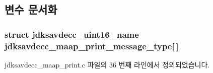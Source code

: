 \subsection{변수 문서화}
\subsubsection[{\texorpdfstring{jdksavdecc\+\_\+maap\+\_\+print\+\_\+message\+\_\+type}{jdksavdecc_maap_print_message_type}}]{\setlength{\rightskip}{0pt plus 5cm}struct {\bf jdksavdecc\+\_\+uint16\+\_\+name} jdksavdecc\+\_\+maap\+\_\+print\+\_\+message\+\_\+type\mbox{[}$\,$\mbox{]}}\hypertarget{group__maap__print_ga1f5dd2597dc39232da1f2dfbb975bf25}{}\label{group__maap__print_ga1f5dd2597dc39232da1f2dfbb975bf25}


jdksavdecc\+\_\+maap\+\_\+print.\+c 파일의 36 번째 라인에서 정의되었습니다.

